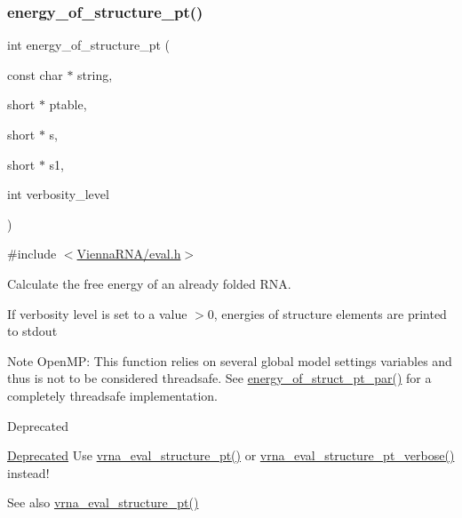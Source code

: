 \subsubsection{\texorpdfstring{energy\+\_\+of\+\_\+structure\+\_\+pt()}{energy\_of\_structure\_pt()}}
{\footnotesize\ttfamily int energy\+\_\+of\+\_\+structure\+\_\+pt (\begin{DoxyParamCaption}\item[{const char $\ast$}]{string,  }\item[{short $\ast$}]{ptable,  }\item[{short $\ast$}]{s,  }\item[{short $\ast$}]{s1,  }\item[{int}]{verbosity\+\_\+level }\end{DoxyParamCaption})}



{\ttfamily \#include $<$\hyperlink{eval_8h}{Vienna\+R\+N\+A/eval.\+h}$>$}



Calculate the free energy of an already folded R\+NA. 

If verbosity level is set to a value $>$0, energies of structure elements are printed to stdout

\begin{DoxyNote}{Note}
Open\+MP\+: This function relies on several global model settings variables and thus is not to be considered threadsafe. See \hyperlink{group__eval_ga49acb3d5627dc6823a7ce12d116d4c69}{energy\+\_\+of\+\_\+struct\+\_\+pt\+\_\+par()} for a completely threadsafe implementation.
\end{DoxyNote}
\begin{DoxyRefDesc}{Deprecated}
\item[\hyperlink{deprecated__deprecated000056}{Deprecated}]Use \hyperlink{group__eval_gadbd09372ddfd7a450bbd590c96a6bfe4}{vrna\+\_\+eval\+\_\+structure\+\_\+pt()} or \hyperlink{group__eval_ga8a517cfeeae8c376ae7b1e0c401d38b4}{vrna\+\_\+eval\+\_\+structure\+\_\+pt\+\_\+verbose()} instead!\end{DoxyRefDesc}


\begin{DoxySeeAlso}{See also}
\hyperlink{group__eval_gadbd09372ddfd7a450bbd590c96a6bfe4}{vrna\+\_\+eval\+\_\+structure\+\_\+pt()}
\end{DoxySeeAlso}

